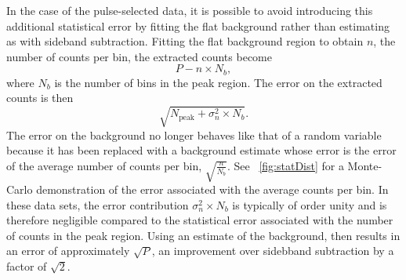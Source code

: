 In the case of the pulse-selected data, it is possible to avoid introducing this additional statistical error by fitting the flat background rather than estimating as with sideband subtraction.  Fitting the flat background region to obtain $n$, the number of counts per bin, the extracted counts become
\begin{equation}
P - n\times N_b,
\end{equation}
where $N_b$ is the number of bins in the peak region.  The error on the extracted counts is then
\begin{equation}
\sqrt{N_{\text{peak}} + {\sigma}_n^2\times N_b}.
\end{equation}
The error on the background no longer behaves like that of a random variable because it has been replaced with a background estimate whose error is the error of the average number of counts per bin, $\sqrt{\frac{n}{N_b}}$.  See \fig~\ref{fig:statDist} for a Monte-Carlo demonstration of the error associated with the average counts per bin.  In these data sets, the error contribution ${\sigma}_n^2\times N_b$ is typically of order unity and is therefore negligible compared to the statistical error associated with the number of counts in the peak region.  Using an estimate of the background, then results in an error of approximately $\sqrt{P}$, an improvement over sidebband subtraction by a factor of $\sqrt{2}$.
